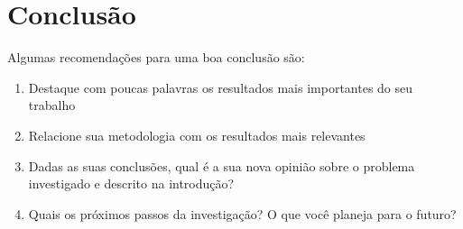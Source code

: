 \chapter{Conclusão}
\label{ch:conclusao}
Algumas recomendações para uma boa conclusão são:

\begin{enumerate}
	\item Destaque com poucas palavras os resultados mais importantes do seu trabalho
	\item Relacione sua metodologia com os resultados mais relevantes
    \item Dadas as suas conclusões, qual é a sua nova opinião sobre o problema investigado e descrito na introdução?
    \item Quais os próximos passos da investigação? O que você planeja para o futuro?

\end{enumerate}